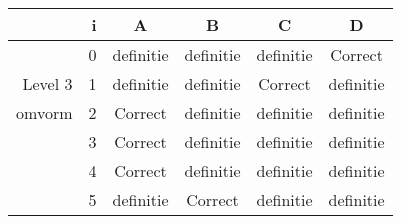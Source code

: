 \begin{tabular}{ rr| c|c|c|c}\hline\hline
     & i & \textbf{A} & \textbf{B} & \textbf{C} & \textbf{D}\\\hline

&0&definitie&definitie&definitie&Correct\cellcolor[gray]{0.6}\\
Level 3 & 1&definitie&definitie&Correct\cellcolor[gray]{0.6}&definitie\\
omvorm &2&Correct\cellcolor[gray]{0.6}&definitie&definitie&definitie\\
&3&Correct\cellcolor[gray]{0.6}&definitie&definitie&definitie\\
&4&Correct\cellcolor[gray]{0.6}&definitie&definitie&definitie\\
&5&definitie&Correct\cellcolor[gray]{0.6}&definitie&definitie\\
\hline\end{tabular}\par\ \newline

